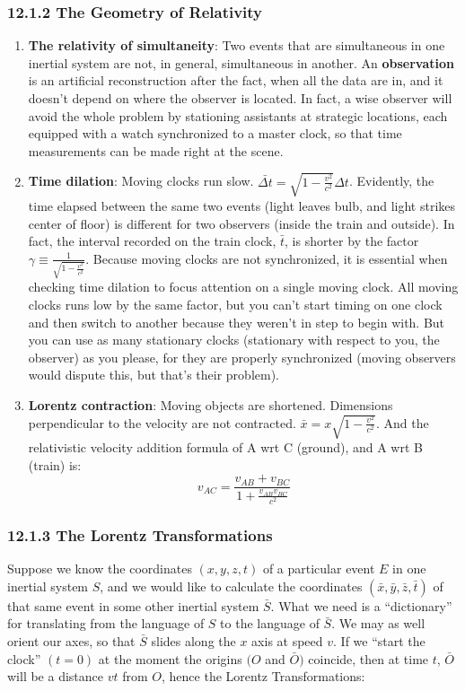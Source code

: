 \documentclass[12pt]{book}
\begin{document}
\subsubsection{12.1.2 The Geometry of Relativity}
    \begin{enumerate}
        \item \textbf{The relativity of simultaneity}: Two events that are simultaneous in one inertial system are not, in general, simultaneous in another. An \textbf{observation} is an artificial reconstruction after the fact, when all the data are in, and it doesn’t depend on where the observer is located. In fact, a wise observer will avoid the whole problem by stationing assistants at strategic locations, each equipped with a watch synchronized to a master clock, so that time measurements can be made right at the scene.
        \item \textbf{Time dilation}: Moving clocks run slow. $\bar{\Delta t} = \sqrt{1 - \frac{v^2}{c^2}}\Delta t$. Evidently, the time elapsed between the same two events (light leaves bulb, and light strikes center of floor) is different for two observers (inside the train and outside). In fact, the interval recorded on the train clock, $\bar{t}$, is shorter by the factor $\gamma \equiv \frac{1}{\sqrt{1 - \frac{v^2}{c^2}}}$. 
        Because moving clocks are not synchronized, it is essential when checking time dilation to focus attention on a single moving clock. All moving clocks runs low by the same factor, but you can’t start timing on one clock and then switch to another because they weren’t in step to begin with. But you can use as many stationary clocks (stationary with respect to you, the observer) as you please, for
        they are properly synchronized (moving observers would dispute this, but that’s their problem).
        \item \textbf{Lorentz contraction}: Moving objects are shortened. Dimensions perpendicular to the velocity are not contracted. $\bar{x} = x \sqrt{1 - \frac{v^2}{c^2}}$. And the relativistic velocity addition formula of A wrt C (ground), and A wrt B (train) is:
        \[
        v_{AC} = \frac{v_{AB} + v_{BC}}{1 + \frac{v_{AB} v_{BC}}{c^2}}
        \]
    \end{enumerate}
    
\subsubsection{12.1.3 The Lorentz Transformations}
    Suppose we know the coordinates $(x, y, z, t)$ of a particular event $E$ in one inertial system $S$, and we would like to calculate the coordinates $(\bar{x}, \bar{y}, \bar{z}, \bar{t})$ of that same event in some other inertial system $\bar{S}$. What we need is a “dictionary” for translating from the language of $S$ to the language of $\bar{S}$. We may as well orient our axes, so that $\bar{S}$ slides along the $x$ axis at speed $v$. If we “start the clock” $(t = 0)$ at the moment the origins $(O $ and $ \bar{O})$ coincide, then at time $t$, $\bar{O}$ will be a distance $vt$ from $O$, hence the Lorentz Transformations:
    
\end{document}
